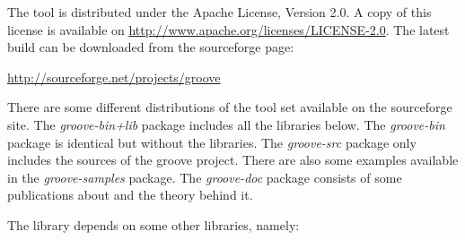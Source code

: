 The \GROOVE tool is distributed under the Apache License, Version 2.0. A copy of
this license is available on \url{http://www.apache.org/licenses/LICENSE-2.0}.
The latest \GROOVE build can be downloaded from the \GROOVE sourceforge page:

\begin{center}
\url{http://sourceforge.net/projects/groove}
\end{center}

There are some different distributions of the \GROOVE tool set available on the
sourceforge site. The \emph{groove-bin+lib} package includes all the libraries
below. The \emph{groove-bin} package is identical but without the libraries.
The \emph{groove-src} package only includes the sources of the groove project.
There are also some examples available in the \emph{groove-samples} package.
The \emph{groove-doc} package consists of some publications about \GROOVE and
the theory behind it.


The \GROOVE library depends on some other libraries, namely:

